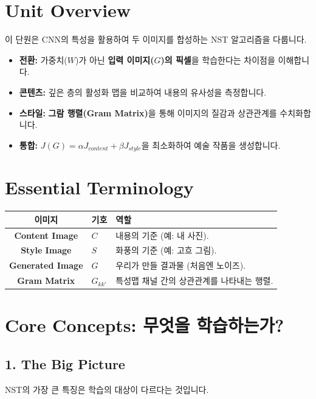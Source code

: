 \documentclass[11pt,a4paper]{book}
\theoremstyle{definition}
\begin{document}
\section{Unit Overview}
\begin{summarybox}[title={핵심 목표}]
이 단원은 CNN의 특성을 활용하여 두 이미지를 합성하는 NST 알고리즘을 다룹니다.
\begin{itemize}
    \item \textbf{전환:} 가중치($W$)가 아닌 \textbf{입력 이미지($G$)의 픽셀}을 학습한다는 차이점을 이해합니다.
    \item \textbf{콘텐츠:} 깊은 층의 활성화 맵을 비교하여 내용의 유사성을 측정합니다.
    \item \textbf{스타일:} \textbf{그람 행렬(Gram Matrix)}을 통해 이미지의 질감과 상관관계를 수치화합니다.
    \item \textbf{통합:} $J(G) = \alpha J_{content} + \beta J_{style}$을 최소화하여 예술 작품을 생성합니다.
\end{itemize}
\end{summarybox}

\section{Essential Terminology}
\begin{center}
\begin{tabular}{|c|l|l|}
\hline
\textbf{이미지} & \textbf{기호} & \textbf{역할} \\ \hline
\textbf{Content Image} & $C$ & 내용의 기준 (예: 내 사진). \\ \hline
\textbf{Style Image} & $S$ & 화풍의 기준 (예: 고흐 그림). \\ \hline
\textbf{Generated Image} & $G$ & 우리가 만들 결과물 (처음엔 노이즈). \\ \hline
\textbf{Gram Matrix} & $G_{kk'}$ & 특성맵 채널 간의 상관관계를 나타내는 행렬. \\ \hline
\end{tabular}
\end{center}

\section{Core Concepts: 무엇을 학습하는가?}

\subsection{1. The Big Picture}
NST의 가장 큰 특징은 학습의 대상이 다르다는 것입니다.
\end{document}
